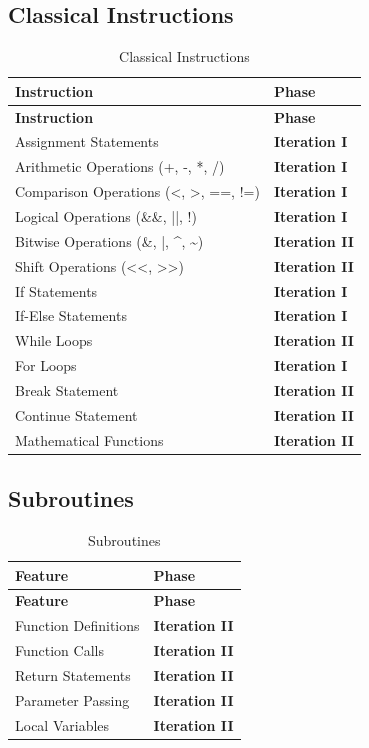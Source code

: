 \subsection{Classical Instructions}
\begin{longtable}{@{}p{10cm}l@{}}
\caption{Classical Instructions}\label{tab:classical-instr}\\
\toprule
\textbf{Instruction} & \textbf{Phase} \\
\midrule
\endfirsthead
\toprule
\textbf{Instruction} & \textbf{Phase} \\
\midrule
\endhead
Assignment Statements & \textbf{Iteration I} \\
Arithmetic Operations (+, -, *, /) & \textbf{Iteration I} \\
Comparison Operations (<, >, ==, !=) & \textbf{Iteration I} \\
Logical Operations (\&\&, ||, !) & \textbf{Iteration I} \\
Bitwise Operations (\&, |, \textasciicircum, \textasciitilde) & \textbf{Iteration II} \\
Shift Operations (<<, >>) & \textbf{Iteration II} \\
If Statements & \textbf{Iteration I} \\
If-Else Statements & \textbf{Iteration I} \\
While Loops & \textbf{Iteration II} \\
For Loops & \textbf{Iteration I} \\
Break Statement & \textbf{Iteration II} \\
Continue Statement & \textbf{Iteration II} \\
Mathematical Functions & \textbf{Iteration II} \\
\bottomrule
\end{longtable}

\subsection{Subroutines}
\begin{longtable}{@{}p{10cm}l@{}}
\caption{Subroutines}\label{tab:subroutines}\\
\toprule
\textbf{Feature} & \textbf{Phase} \\
\midrule
\endfirsthead
\toprule
\textbf{Feature} & \textbf{Phase} \\
\midrule
\endhead
Function Definitions & \textbf{Iteration II} \\
Function Calls & \textbf{Iteration II} \\
Return Statements & \textbf{Iteration II} \\
Parameter Passing & \textbf{Iteration II} \\
Local Variables & \textbf{Iteration II} \\
\bottomrule
\end{longtable}

